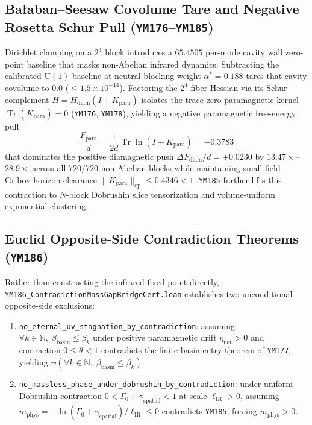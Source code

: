 \documentclass[11pt,a4paper]{article}
\begin{document}
\subsection{Ba{\l}aban--Seesaw Covolume Tare and Negative Rosetta Schur Pull (\texttt{YM176}--\texttt{YM185})}
Dirichlet clamping on a $2^4$ block introduces a $65.4505$ per-mode cavity wall zero-point baseline that masks non-Abelian infrared dynamics. Subtracting the calibrated $\mathrm{U}(1)$ baseline at neutral blocking weight $\alpha^* = 0.188$ tares that cavity covolume to $0.0$ ($\le 1.5\times 10^{-14}$). Factoring the $2^4$-fiber Hessian via its Schur complement $H = H_{\mathrm{diam}}(I + K_{\mathrm{para}})$ isolates the trace-zero paramagnetic kernel $\operatorname{Tr}(K_{\mathrm{para}}) = 0$ (\texttt{YM176}, \texttt{YM178}), yielding a negative paramagnetic free-energy pull
\[
\frac{F_{\mathrm{para}}}{d} = \frac{1}{2d}\operatorname{Tr}\ln(I + K_{\mathrm{para}}) = -0.3783
\]
that dominates the positive diamagnetic push $\Delta F_{\mathrm{diam}}/d = +0.0230$ by $13.47\times$--$28.9\times$ across all $720/720$ non-Abelian blocks while maintaining small-field Gribov-horizon clearance $\|K_{\mathrm{para}}\|_{\mathrm{op}} \le 0.4346 < 1$. \texttt{YM185} further lifts this contraction to $N$-block Dobrushin slice tensorization and volume-uniform exponential clustering.

\subsection{Euclid Opposite-Side Contradiction Theorems (\texttt{YM186})}
Rather than constructing the infrared fixed point directly, \texttt{YM186\_\allowbreak ContradictionMassGapBridgeCert.lean} establishes two unconditional opposite-side exclusions:
\begin{enumerate}
\item \texttt{no\_\allowbreak eternal\_\allowbreak uv\_\allowbreak stagnation\_\allowbreak by\_\allowbreak contradiction}: assuming $\forall k \in \mathbb{N},\; \beta_{\mathrm{basin}} \le \beta_k$ under positive paramagnetic drift $\eta_{\mathrm{net}} > 0$ and contraction $0 \le \theta < 1$ contradicts the finite basin-entry theorem of \texttt{YM177}, yielding $\neg(\forall k \in \mathbb{N},\; \beta_{\mathrm{basin}} \le \beta_k)$.
\item \texttt{no\_\allowbreak massless\_\allowbreak phase\_\allowbreak under\_\allowbreak dobrushin\_\allowbreak by\_\allowbreak contradiction}: under uniform Dobrushin contraction $0 < \Gamma_0 + \gamma_{\mathrm{spatial}} < 1$ at scale $\ell_{\mathrm{IR}} > 0$, assuming $m_{\mathrm{phys}} = -\ln(\Gamma_0 + \gamma_{\mathrm{spatial}})/\ell_{\mathrm{IR}} \le 0$ contradicts \texttt{YM185}, forcing $m_{\mathrm{phys}} > 0$.
\end{enumerate}
\end{document}
